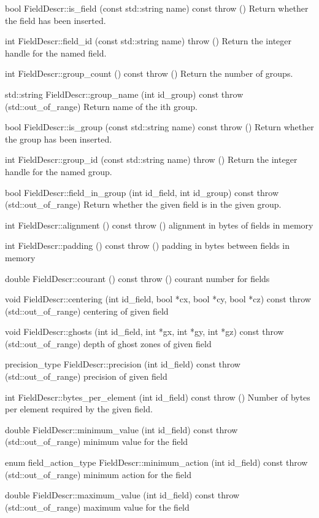 \documentclass{book}
\begin{document}
bool 	FieldDescr::is\_field (const std::string name) const throw ()
 	Return whether the field has been inserted.

int 	FieldDescr::field\_id (const std::string name) throw ()
 	Return the integer handle for the named field.

int 	FieldDescr::group\_count () const throw ()
 	Return the number of groups.

std::string 	FieldDescr::group\_name (int id\_group) const throw (std::out\_of\_range)
 	Return name of the ith group.

bool 	FieldDescr::is\_group (const std::string name) const throw ()
 	Return whether the group has been inserted.

int 	FieldDescr::group\_id (const std::string name) throw ()
 	Return the integer handle for the named group.

bool 	FieldDescr::field\_in\_group (int id\_field, int id\_group) const throw (std::out\_of\_range)
 	Return whether the given field is in the given group.

int 	FieldDescr::alignment () const throw ()
 	alignment in bytes of fields in memory

int 	FieldDescr::padding () const throw ()
 	padding in bytes between fields in memory

double 	FieldDescr::courant () const throw ()
 	courant number for fields

void 	FieldDescr::centering (int id\_field, bool *cx, bool *cy, bool *cz) const throw (std::out\_of\_range)
 	centering of given field

void 	FieldDescr::ghosts (int id\_field, int *gx, int *gy, int *gz) const throw (std::out\_of\_range)
 	depth of ghost zones of given field

precision\_type 	FieldDescr::precision (int id\_field) const throw (std::out\_of\_range)
 	precision of given field

int 	FieldDescr::bytes\_per\_element (int id\_field) const throw ()
 	Number of bytes per element required by the given field.

double 	FieldDescr::minimum\_value (int id\_field) const throw (std::out\_of\_range)
 	minimum value for the field

enum field\_action\_type 	FieldDescr::minimum\_action (int id\_field) const throw (std::out\_of\_range)
 	minimum action for the field

double 	FieldDescr::maximum\_value (int id\_field) const throw (std::out\_of\_range)
 	maximum value for the field
\end{document}
